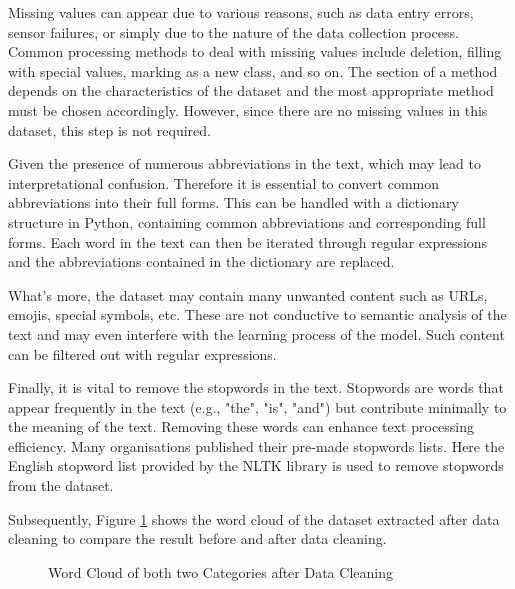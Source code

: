\documentclass[ %
                    author={Louis Wang},
                supervisor={Dr. Qiang Liu},
                    degree={MSc},
                     title={Identification of Suicide Ideation in Texts},
                      type={},
                      year={2024}]{dissertation}
\begin{document}
Missing values can appear due to various reasons, such as data entry errors, sensor failures, or simply due to the nature of the data collection process. Common processing methods to deal with missing values include deletion, filling with special values, marking as a new class, and so on. The section of a method depends on the characteristics of the dataset and the most appropriate method must be chosen accordingly. However, since there are no missing values in this dataset, this step is not required.

Given the presence of numerous abbreviations in the text, which may lead to interpretational confusion. Therefore it is essential to convert common abbreviations into their full forms. This can be handled with a dictionary structure in Python, containing common abbreviations and corresponding full forms. Each word in the text can then be iterated through regular expressions and the abbreviations contained in the dictionary are replaced.

What's more, the dataset may contain many unwanted content such as URLs, emojis, special symbols, etc. These are not conductive to semantic analysis of the text and may even interfere with the learning process of the model. Such content can be filtered out with regular expressions.

Finally, it is vital to remove the stopwords in the text. Stopwords are words that appear frequently in the text (e.g., "the", "is", "and") but contribute minimally to the meaning of the text. Removing these words can enhance text processing efficiency. Many organisations published their pre-made stopwords lists. Here the English stopword list provided by the NLTK library is used to remove stopwords from the dataset.

Subsequently, Figure \ref{fig:word cloud clean} shows the word cloud of the dataset extracted after data cleaning to compare the result before and after data cleaning.

\begin{figure}[h]
      \centering
      \hfil
      \caption{Word Cloud of both two Categories after Data Cleaning}
      \label{fig:word cloud clean}
\end{figure}
\end{document}
